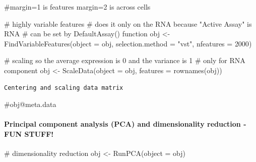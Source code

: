 \documentclass[
  letterpaper,
  DIV=11,
  numbers=noendperiod]{scrartcl}
\let\oldparagraph\paragraph
\renewcommand{\paragraph}[1]{\oldparagraph{#1}\mbox{}}
\newenvironment{Shaded}{\begin{snugshade}}{\end{snugshade}}
\newcommand{\AttributeTok}[1]{\textcolor[rgb]{0.40,0.45,0.13}{#1}}
\newcommand{\CommentTok}[1]{\textcolor[rgb]{0.37,0.37,0.37}{#1}}
\newcommand{\DecValTok}[1]{\textcolor[rgb]{0.68,0.00,0.00}{#1}}
\newcommand{\FunctionTok}[1]{\textcolor[rgb]{0.28,0.35,0.67}{#1}}
\newcommand{\NormalTok}[1]{\textcolor[rgb]{0.00,0.23,0.31}{#1}}
\newcommand{\OtherTok}[1]{\textcolor[rgb]{0.00,0.23,0.31}{#1}}
\newcommand{\StringTok}[1]{\textcolor[rgb]{0.13,0.47,0.30}{#1}}
\begin{document}
\begin{Shaded}
\begin{Highlighting}[]
\CommentTok{\#margin=1 is features margin=2 is across cells}

\CommentTok{\# highly variable features}
\CommentTok{\# does it only on the RNA because "Active Assay" is RNA}
\CommentTok{\# can be set by DefaultAssay() function}
\NormalTok{obj }\OtherTok{\textless{}{-}} \FunctionTok{FindVariableFeatures}\NormalTok{(}\AttributeTok{object =}\NormalTok{ obj, }\AttributeTok{selection.method =} \StringTok{"vst"}\NormalTok{,}
                            \AttributeTok{nfeatures =} \DecValTok{2000}\NormalTok{)}

\CommentTok{\# scaling so the average expression is 0 and the variance is 1}
\CommentTok{\# only for RNA component }
\NormalTok{obj }\OtherTok{\textless{}{-}} \FunctionTok{ScaleData}\NormalTok{(}\AttributeTok{object =}\NormalTok{ obj, }\AttributeTok{features =} \FunctionTok{rownames}\NormalTok{(obj))}
\end{Highlighting}
\end{Shaded}

\begin{verbatim}
Centering and scaling data matrix
\end{verbatim}

\begin{Shaded}
\begin{Highlighting}[]
\CommentTok{\#obj@meta.data}
\end{Highlighting}
\end{Shaded}

\hypertarget{principal-component-analysis-pca-and-dimensionality-reduction--fun-stuff}{%
\paragraph{Principal component analysis (PCA) and dimensionality
reduction -FUN
STUFF!}\label{principal-component-analysis-pca-and-dimensionality-reduction--fun-stuff}}

\begin{Shaded}
\begin{Highlighting}[]
\CommentTok{\# dimensionality reduction}
\NormalTok{obj }\OtherTok{\textless{}{-}} \FunctionTok{RunPCA}\NormalTok{(}\AttributeTok{object =}\NormalTok{ obj)}
\end{Highlighting}
\end{Shaded}
\end{document}
